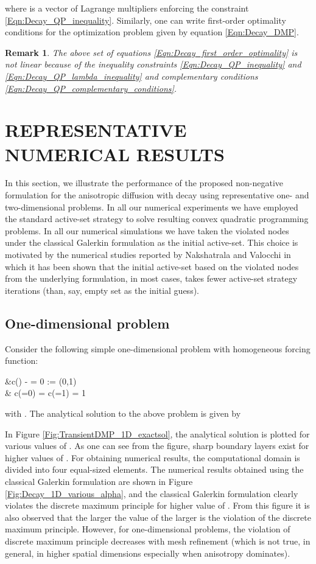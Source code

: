 \documentclass[11pt]{amsart}
\newtheorem{remark}[theorem]{Remark}
\begin{document}
where  is a vector of Lagrange multipliers enforcing 
the constraint \eqref{Eqn:Decay_QP_inequality}. Similarly, one can write 
first-order optimality conditions for the optimization problem given by 
equation \eqref{Eqn:Decay_DMP}.

\begin{remark}
  The above set of equations \eqref{Eqn:Decay_first_order_optimality} is not 
  linear because of the inequality constraints \eqref{Eqn:Decay_QP_inequality} 
  and \eqref{Eqn:Decay_QP_lambda_inequality} and complementary conditions 
  \eqref{Eqn:Decay_QP_complementary_conditions}.  
\end{remark} 
\section{REPRESENTATIVE NUMERICAL RESULTS}
\label{Sec:Decay_NR}
In this section, we illustrate the performance of the proposed non-negative formulation 
for the anisotropic diffusion with decay using representative one- and two-dimensional 
problems. 
In all our numerical experiments we have employed the standard active-set strategy 
\cite{Luenberger_Ye_Nonlinear_Programming} to solve resulting convex quadratic 
programming problems. In all our numerical simulations we have taken the violated 
nodes under the classical Galerkin formulation as the initial active-set. This choice 
is motivated by the numerical studies reported by Nakshatrala and Valocchi 
\cite{Nakshatrala_Valocchi_JCP_2009_v228_p6726} in which it has been shown that the 
initial active-set based on the violated nodes from the underlying formulation, in most cases, 
takes fewer active-set strategy iterations (than, say, empty set as the initial guess). 

\subsection{One-dimensional problem}
Consider the following simple one-dimensional problem with homogeneous forcing function: 

    &\alpha c() -   =  0 
    \quad {} \; \Omega := (0,1) \\
    & c(=0) = c(=1) = 1
  
with . The analytical solution to the above problem is given by 

In Figure \ref{Fig:TransientDMP_1D_exactsol}, the analytical solution is plotted for various 
values of . As one can see from the figure, sharp boundary layers exist for higher 
values of . For obtaining numerical results, the computational domain is divided 
into four equal-sized elements. The numerical results obtained using the classical Galerkin 
formulation are shown in Figure \ref{Fig:Decay_1D_various_alpha}, and the classical Galerkin 
formulation clearly violates the discrete maximum principle for higher value of . 
From this figure it is also observed that the larger the value of  the larger is 
the violation of the discrete maximum principle. However, for one-dimensional problems, 
the violation of discrete maximum principle decreases with mesh refinement (which is not 
true, in general, in higher spatial dimensions especially when anisotropy dominates).  
\end{document}
